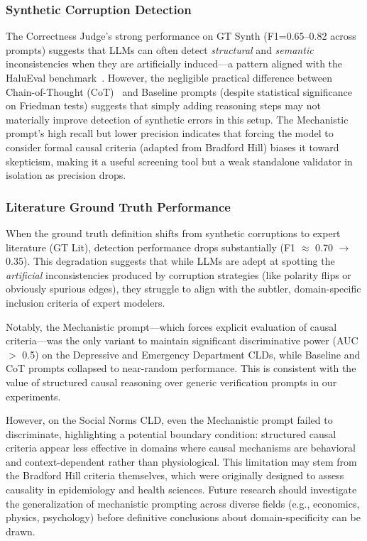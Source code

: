 \subsubsection{Synthetic Corruption Detection}

The Correctness Judge's strong performance on GT Synth (F1=0.65--0.82 across prompts) suggests that LLMs can often detect \textit{structural} and \textit{semantic} inconsistencies when they are artificially induced---a pattern aligned with the HaluEval benchmark~\citep{li2023halueval}. However, the negligible practical difference between Chain-of-Thought (CoT)~\citep{kojima2022large} and Baseline prompts (despite statistical significance on Friedman tests) suggests that simply adding reasoning steps may not materially improve detection of synthetic errors in this setup. The Mechanistic prompt's high recall but lower precision indicates that forcing the model to consider formal causal criteria (adapted from Bradford Hill) biases it toward skepticism, making it a useful screening tool but a weak standalone validator in isolation as precision drops.

\subsubsection{Literature Ground Truth Performance}

When the ground truth definition shifts from synthetic corruptions to expert literature (GT Lit), detection performance drops substantially (F1 $\approx$ 0.70 $\rightarrow$ 0.35). This degradation suggests that while LLMs are adept at spotting the \textit{artificial} inconsistencies produced by corruption strategies (like polarity flips or obviously spurious edges), they struggle to align with the subtler, domain-specific inclusion criteria of expert modelers.

Notably, the Mechanistic prompt---which forces explicit evaluation of causal criteria---was the only variant to maintain significant discriminative power (AUC $>$ 0.5) on the Depressive and Emergency Department CLDs, while Baseline and CoT prompts collapsed to near-random performance. This is consistent with the value of structured causal reasoning over generic verification prompts in our experiments.

However, on the Social Norms CLD, even the Mechanistic prompt failed to discriminate, highlighting a potential boundary condition: structured causal criteria appear less effective in domains where causal mechanisms are behavioral and context-dependent rather than physiological. This limitation may stem from the Bradford Hill criteria themselves, which were originally designed to assess causality in epidemiology and health sciences. Future research should investigate the generalization of mechanistic prompting across diverse fields (e.g., economics, physics, psychology) before definitive conclusions about domain-specificity can be drawn.


